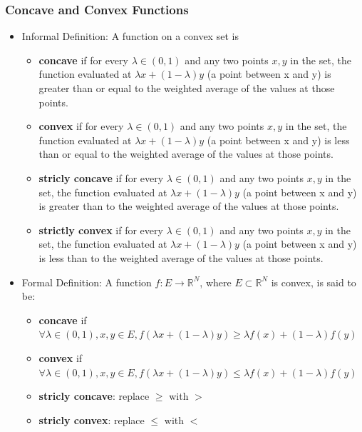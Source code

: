 \documentclass{article}
\begin{document}
\subsubsection{Concave and Convex Functions}
\begin{itemize}
    \item Informal Definition: A function on a convex set is 
    \begin{itemize}
        \item \textbf{concave} if for every $ \lambda \in (0,1) $
        and any two points $ x, y $ in the set, the function evaluated at $ 
        \lambda x + (1 - \lambda)y $ (a point between x and y) is greater than 
        or equal to the weighted average of the values at those points.
        \item \textbf{convex} if for every $ \lambda \in (0,1) $
        and any two points $ x, y $ in the set, the function evaluated at $ 
        \lambda x + (1 - \lambda)y $ (a point between x and y) is less than or 
        equal to the weighted average of the values at those points.
        \item \textbf{stricly concave} if for every $ \lambda \in (0,1) $
        and any two points $ x, y $ in the set, the function evaluated at $ 
        \lambda x + (1 - \lambda)y $ (a point between x and y) is greater than 
        to the weighted average of the values at those points.
        \item \textbf{strictly convex} if for every $ \lambda \in (0,1) $
        and any two points $ x, y $ in the set, the function evaluated at $ 
        \lambda x + (1 - \lambda)y $ (a point between x and y) is less than to 
        the weighted average of the values at those points.
    \end{itemize}
    \item Formal Definition: A function $ f : E \rightarrow \mathbb{R}^N $,
    where $ E \subset \mathbb{R}^N $ is convex, is said to be:
    \begin{itemize}
        \item \textbf{concave} if $ \forall \lambda \in (0, 1), x, y \in E, 
        f(\lambda x + (1 - \lambda)y) \ge \lambda f(x) + (1 - \lambda) f(y) $
        \item \textbf{convex} if $ \forall \lambda \in (0, 1), x, y \in E, 
        f(\lambda x + (1 - \lambda)y) \le \lambda f(x) + (1 - \lambda) f(y) $
        \item \textbf{stricly concave}: replace $ \ge $ with $ > $
        \item \textbf{stricly convex}: replace $ \le $ with $ < $

\end{itemize}
\end{itemize}
\end{document}

